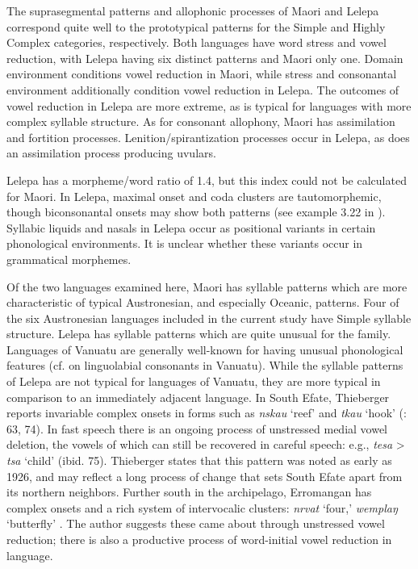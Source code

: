   The suprasegmental patterns and allophonic processes of Maori and Lelepa correspond quite well to the prototypical patterns for the Simple and Highly Complex categories, respectively. Both languages have word stress and vowel reduction, with Lelepa having six distinct patterns and Maori only one. Domain environment conditions vowel reduction in Maori, while stress and consonantal environment additionally condition vowel reduction in Lelepa. The outcomes of vowel reduction in Lelepa are more extreme, as is typical for languages with more complex syllable structure. As for consonant allophony, Maori has assimilation and fortition processes. Lenition/spirantization processes occur in Lelepa, as does an assimilation process producing uvulars.

  Lelepa has a morpheme/word ratio of 1.4, but this index could not be calculated for Maori. In Lelepa, maximal onset and coda clusters are tautomorphemic, though biconsonantal onsets may show both patterns (see example 3.22 in ). Syllabic liquids and nasals in Lelepa occur as positional variants in certain phonological environments. It is unclear whether these variants occur in grammatical morphemes.

  Of the two languages examined here, Maori has syllable patterns which are more characteristic of typical Austronesian, and especially Oceanic, patterns. Four of the six Austronesian languages included in the current study have Simple syllable structure. Lelepa has syllable patterns which are quite unusual for the family. Languages of Vanuatu are generally well-known for having unusual phonological features (cf. \citealt{Maddieson1989b} on linguolabial consonants in Vanuatu). While the syllable patterns of Lelepa are not typical for languages of Vanuatu, they are more typical in comparison to an immediately adjacent language. In South Efate, Thieberger reports invariable complex onsets in forms such as \textit{nskau} ‘reef’ and \textit{tkau} ‘hook’ (\citealt{Thieberger2004}: 63, 74). In fast speech there is an ongoing process of unstressed medial vowel deletion, the vowels of which can still be recovered in careful speech: e.g., \textit{tesa} > \textit{tsa} ‘child’ (ibid. 75). Thieberger states that this pattern was noted as early as 1926, and may reflect a long process of change that sets South Efate apart from its northern neighbors. Further south in the archipelago, Erromangan has complex onsets and a rich system of intervocalic clusters: \textit{nrvat} ‘four,’ \textit{wemplaŋ} ‘butterfly’ \citep[20-2]{Crowley1998}. The author suggests these came about through unstressed vowel reduction; there is also a productive process of word-initial vowel reduction in language.

